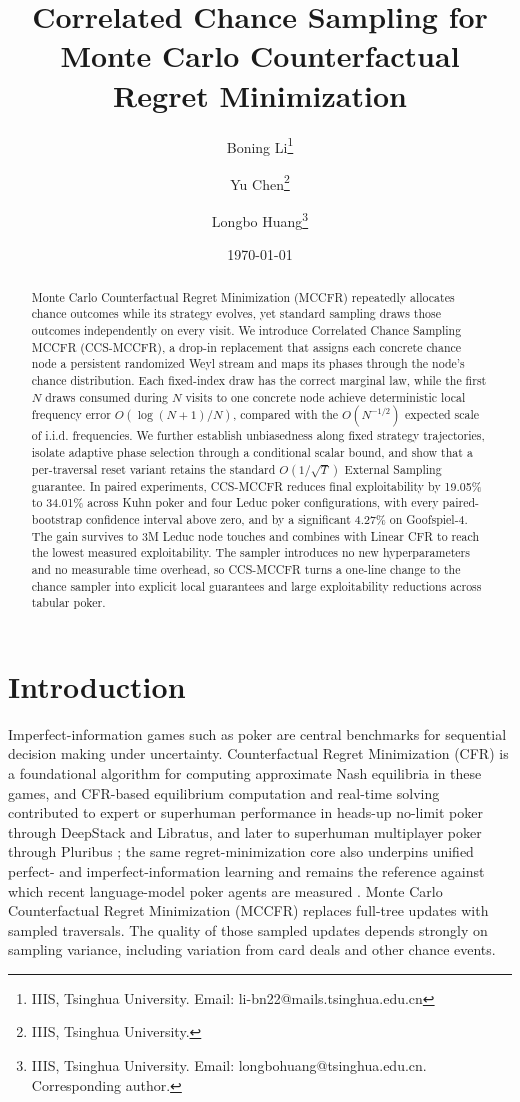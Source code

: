 \documentclass[11pt]{article}
\title{Correlated Chance Sampling for Monte Carlo Counterfactual Regret Minimization}
\author{Boning Li\thanks{IIIS, Tsinghua University. Email: li-bn22@mails.tsinghua.edu.cn}
\and Yu Chen\thanks{IIIS, Tsinghua University.}
\and Longbo Huang\thanks{IIIS, Tsinghua University. Email: longbohuang@tsinghua.edu.cn. Corresponding author.}}
\date{\today}
\begin{document}
\maketitle

\begin{abstract}
Monte Carlo Counterfactual Regret Minimization (MCCFR) repeatedly allocates chance outcomes while its strategy evolves, yet standard sampling draws those outcomes independently on every visit. We introduce Correlated Chance Sampling MCCFR (CCS-MCCFR), a drop-in replacement that assigns each concrete chance node a persistent randomized Weyl stream and maps its phases through the node's chance distribution. Each fixed-index draw has the correct marginal law, while the first $N$ draws consumed during $N$ visits to one concrete node achieve deterministic local frequency error $O(\!\log(N+1)/N)$, compared with the $O(N^{-1/2})$ expected scale of i.i.d. frequencies. We further establish unbiasedness along fixed strategy trajectories, isolate adaptive phase selection through a conditional scalar bound, and show that a per-traversal reset variant retains the standard $O(1/\sqrt{T})$ External Sampling guarantee. In paired experiments, CCS-MCCFR reduces final exploitability by 19.05\% to 34.01\% across Kuhn poker and four Leduc poker configurations, with every paired-bootstrap confidence interval above zero, and by a significant 4.27\% on Goofspiel-4. The gain survives to 3M Leduc node touches and combines with Linear CFR to reach the lowest measured exploitability. The sampler introduces no new hyperparameters and no measurable time overhead, so CCS-MCCFR turns a one-line change to the chance sampler into explicit local guarantees and large exploitability reductions across tabular poker.
\end{abstract}

\section{Introduction}

Imperfect-information games such as poker are central benchmarks for sequential decision making under uncertainty. Counterfactual Regret Minimization (CFR) \cite{zinkevich2007regret} is a foundational algorithm for computing approximate Nash equilibria in these games, and CFR-based equilibrium computation and real-time solving contributed to expert or superhuman performance in heads-up no-limit poker through DeepStack and Libratus, and later to superhuman multiplayer poker through Pluribus \citep{moravcik2017deepstack,brown2018superhuman,brown2019superhuman}; the same regret-minimization core also underpins unified perfect- and imperfect-information learning \citep{schmid2023student} and remains the reference against which recent language-model poker agents are measured \citep{li2026pokerskill}. Monte Carlo Counterfactual Regret Minimization (MCCFR) \cite{lanctot2009monte} replaces full-tree updates with sampled traversals. The quality of those sampled updates depends strongly on sampling variance, including variation from card deals and other chance events.
\end{document}
